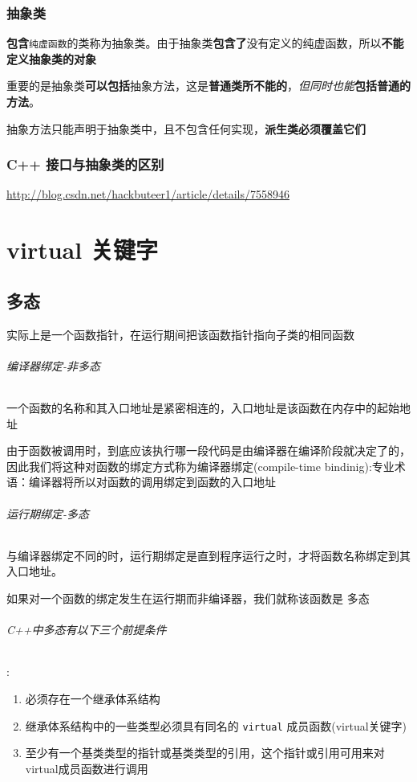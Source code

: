 \documentclass[UTF8,a4paper,12pt]{ctexbook} %
\begin{document}
	\subsection{抽象类}
		\textbf{包含}\verb|纯虚函数|的类称为抽象类。由于抽象类\textbf{包含了}没有定义的纯虚函数，所以\textbf{不能定义抽象类的对象}
      
	    重要的是抽象类\textbf{可以包括}抽象方法，这是\textbf{普通类所不能的}，\textit{但同时也能}\textbf{包括普通的方法}。
	    
	    抽象方法只能声明于抽象类中，且不包含任何实现，\textbf{派生类必须覆盖它们}
	    
	 \subsection{C++ 接口与抽象类的区别}
		 \url{http://blog.csdn.net/hackbuteer1/article/details/7558946}
		 
		 
\chapter{virtual  关键字}
\section{多态}实际上是一个函数指针，在运行期间把该函数指针指向子类的相同函数
		
		\subparagraph{编译器绑定-非多态}一个函数的名称和其入口地址是紧密相连的，入口地址是该函数在内存中的起始地址
		
		由于函数被调用时，到底应该执行哪一段代码是由编译器在编译阶段就决定了的，因此我们将这种对函数的绑定方式称为编译器绑定(compile-time  bindinig):专业术语：编译器将所以对函数的调用绑定到函数的入口地址
		
		\subparagraph{运行期绑定-多态}与编译器绑定不同的时，运行期绑定是直到程序运行之时，才将函数名称绑定到其入口地址。
		
		如果对一个函数的绑定发生在运行期而非编译器，我们就称该函数是   多态
		
		\subparagraph{C++中多态有以下三个前提条件}:
			\begin{enumerate}[fullwidth,itemindent = 2em]
				\item 必须存在一个继承体系结构
				\item 继承体系结构中的一些类型必须具有同名的 \verb|virtual| 成员函数(virtual关键字)
				\item 至少有一个基类类型的指针或基类类型的引用，这个指针或引用可用来对virtual成员函数进行调用
			\end{enumerate}
		
\end{document}
